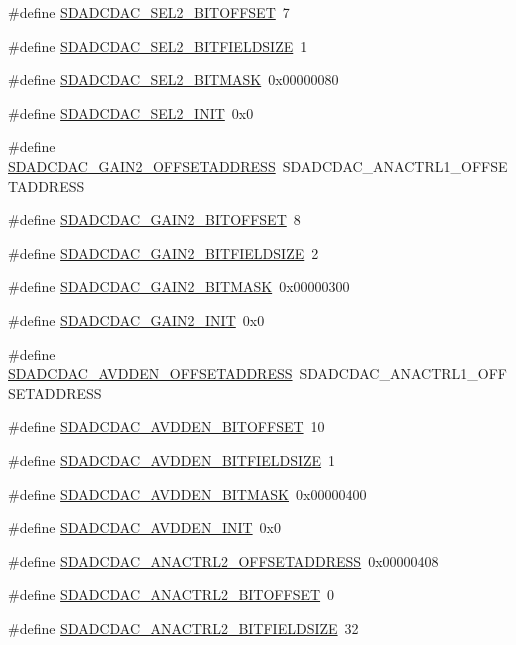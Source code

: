 \begin{DoxyCompactItemize}
\item 
\#define \hyperlink{a00569_a654905fc8bcd75ac5be6b6b719ace1ab}{SDADCDAC\_\-SEL2\_\-BITOFFSET}~7
\item 
\#define \hyperlink{a00569_a4d84ed3b4ccf4ee27cd3f4d5c52cd3dd}{SDADCDAC\_\-SEL2\_\-BITFIELDSIZE}~1
\item 
\#define \hyperlink{a00569_a656c1e7239f154f84f7d2c8a4f071055}{SDADCDAC\_\-SEL2\_\-BITMASK}~0x00000080
\item 
\#define \hyperlink{a00569_a26e86b1be0c4acd3025ee57142d2de34}{SDADCDAC\_\-SEL2\_\-INIT}~0x0
\item 
\#define \hyperlink{a00569_af4c1dfa69055df01cec8b59d87fe000c}{SDADCDAC\_\-GAIN2\_\-OFFSETADDRESS}~SDADCDAC\_\-ANACTRL1\_\-OFFSETADDRESS
\item 
\#define \hyperlink{a00569_a565f667a852450c567b3ca5b5589a1b2}{SDADCDAC\_\-GAIN2\_\-BITOFFSET}~8
\item 
\#define \hyperlink{a00569_a1234514f1da1a47c32e2d92ebe377119}{SDADCDAC\_\-GAIN2\_\-BITFIELDSIZE}~2
\item 
\#define \hyperlink{a00569_ac3d611b241d0fda5b84f38eaaaf31864}{SDADCDAC\_\-GAIN2\_\-BITMASK}~0x00000300
\item 
\#define \hyperlink{a00569_a3cac152a864b89073381cdde9f64f521}{SDADCDAC\_\-GAIN2\_\-INIT}~0x0
\item 
\#define \hyperlink{a00569_a423acfa9b70344c1bf920c6922577e33}{SDADCDAC\_\-AVDDEN\_\-OFFSETADDRESS}~SDADCDAC\_\-ANACTRL1\_\-OFFSETADDRESS
\item 
\#define \hyperlink{a00569_acd3a69a6aaf618d65457f20445ecc3d5}{SDADCDAC\_\-AVDDEN\_\-BITOFFSET}~10
\item 
\#define \hyperlink{a00569_a875f9810de2c7acb1747823331c46ad5}{SDADCDAC\_\-AVDDEN\_\-BITFIELDSIZE}~1
\item 
\#define \hyperlink{a00569_a1a0ceb95a486924228bf24773636ff1d}{SDADCDAC\_\-AVDDEN\_\-BITMASK}~0x00000400
\item 
\#define \hyperlink{a00569_aa6bdcb35432a2452a459fb1c4327c127}{SDADCDAC\_\-AVDDEN\_\-INIT}~0x0
\item 
\#define \hyperlink{a00569_afd7e82b36f1a5e2ab52ac8cdd7dec81c}{SDADCDAC\_\-ANACTRL2\_\-OFFSETADDRESS}~0x00000408
\item 
\#define \hyperlink{a00569_a6cf441d7e351625b4d22adf9f46a032b}{SDADCDAC\_\-ANACTRL2\_\-BITOFFSET}~0
\item 
\#define \hyperlink{a00569_aee7a989d2ff0fb8217fe9f132ae8d243}{SDADCDAC\_\-ANACTRL2\_\-BITFIELDSIZE}~32
\item 

\end{DoxyCompactItemize}
